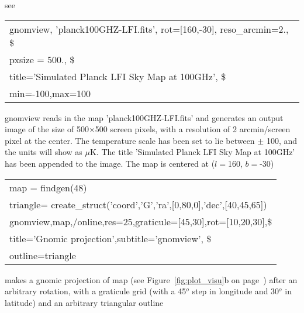 %
\begin{related}
  \begin{sulist}{} %
  \item[{\ }] see 
  \end{sulist}
\end{related}

\begin{examples}{1}
{
\begin{tabular}{l} %
gnomview,  'planck100GHZ-LFI.fits', rot=[160,-30], reso\_arcmin=2., \$ \\
\hspace{1em}           pxsize = 500., \$ \\
\hspace{1em}           title='Simulated Planck LFI Sky Map at 100GHz',  \$ \\
\hspace{1em}           min=-100,max=100\\
\end{tabular}
}
{gnomview reads in the map 'planck100GHZ-LFI.fits' and generates
an output image of the size of 500$\times$500 screen pixels, 
with a resolution of 2 arcmin/screen pixel at the center.
The temperature scale has been set to lie between $\pm$ 100, and the units will
show as $\mu$K.
The title 'Simulated Planck
LFI Sky Map at 100GHz' has been appended to the image. 
The map is centered at ($l=$160, $b=$-30) }
\end{examples}

\begin{examples}{2}
{
\begin{tabular}{l} %

map  = findgen(48) \\
triangle= create\_struct('coord','G','ra',[0,80,0],'dec',[40,45,65]) \\
gnomview,map,/online,res=25,graticule=[45,30],rot=[10,20,30],\$ \\
\hspace{1em}	   title='Gnomic projection',subtitle='gnomview', \$ \\
\hspace{1em}           outline=triangle \\
\end{tabular}
}
{makes a gnomic projection of map (see Figure~\ref{fig:plot_visu}b on
page~\pageref{page:plot_visu}) after an arbitrary rotation, with a graticule grid
(with a 45$^o$ step in longitude and 30$^o$ in latitude) and an arbitrary triangular outline}
\end{examples}
